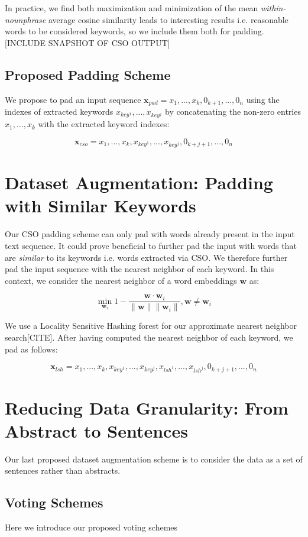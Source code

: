 In practice, we find both maximization and minimization of the mean \textit{within-nounphrase}
average cosine similarity leads to interesting results i.e. reasonable words to be
considered keywords, so we include them both for padding.
[INCLUDE SNAPSHOT OF CSO OUTPUT]

\subsection{Proposed Padding Scheme}
We propose to pad an input sequence $\bm{x}_{pad} = x_1, ..., x_k, 0_{k+1}, ..., 0_n$ using
the indexes of extracted keywords $x_{key^1}, ..., x_{key^j}$ by concatenating
the non-zero entries $x_1, ..., x_k$ with the extracted keyword indexes:

\[\bm{x}_{cso} = x_1, ..., x_k, x_{key^1}, ..., x_{key^j}, 0_{k+j+1}, ..., 0_n\]


\section{Dataset Augmentation: Padding with Similar Keywords}
Our CSO padding scheme can only pad with words already present in the input
text sequence. It could prove beneficial to further pad the input with words that are \textit{similar}
to its keywords i.e. words extracted via CSO. We therefore further pad the input sequence
with the nearest neighbor of each keyword. In this context, we consider the nearest neighbor
of a word embeddings $\bm{w}$ as:

\[\min_{\bm{w}_i} 1 - \frac{\bm{w} \cdot \bm{w}_i}{\lVert \bm{w} \rVert \lVert \bm{w}_i \rVert}, \bm{w} \neq \bm{w}_i\]

We use a Locality Sensitive Hashing forest for our approximate nearest neighbor search[CITE].
After having computed the nearest neighbor of each keyword, we pad as follows:

\[\bm{x}_{lsh} = x_1, ..., x_k, x_{key^1}, ..., x_{key^j},x_{lsh^1}, ..., x_{lsh^j}, 0_{k+j+1}, ..., 0_n\]

\section{Reducing Data Granularity: From Abstract to Sentences}
Our last proposed dataset augmentation scheme is to consider the data as a set of sentences rather than abstracts.
\subsection{Voting Schemes}
Here we introduce our proposed voting schemes
